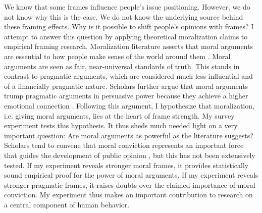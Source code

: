 \documentclass[11pt]{article}
\begin{document}
We know that some frames influence people's issue positioning. However, we do not know why this is the case. We do not know the underlying source behind these framing effects. Why is it possible to shift people's opinions with frames? I attempt to answer this question by applying theoretical moralization claims to empirical framing research. Moralization literature asserts that moral arguments are essential to how people make sense of the world around them \citep{mooney_public_2001}. Moral arguments are seen as fair, near-universal standards of truth. This stands in contrast to pragmatic arguments, which are considered much less influential and of a financially pragmatic nature. Scholars further argue that moral arguments trump pragmatic arguments in persuasive power because they achieve a higher emotional connection \citep{haidt_moral_2003}. Following this argument, I hypothesize that moralization, i.e. giving moral arguments, lies at the heart of frame strength. My survey experiment tests this hypothesis. It thus sheds much needed light on a very important question: Are moral arguments as powerful as the literature suggests? Scholars tend to convene that moral conviction represents an important force that guides the development of public opinion \citep{skitka_moral_2005,skitka_moral_2011}, but this has not been extensively tested. If my experiment reveals stronger moral frames, it provides statistically sound empirical proof for the power of moral arguments. If my experiment reveals stronger pragmatic frames, it raises doubts over the claimed importance of moral conviction. My experiment thus makes an important contribution to research on a central component of human behavior.

\clearpage


 
\end{document}
